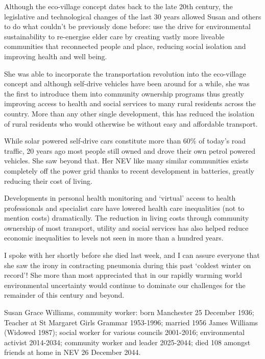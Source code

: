 Although the eco-village concept dates back to the late 20th century, the legislative and technological changes of the last 30 years allowed Susan and others to do what couldn't be previously done before: use the drive for environmental sustainability to re-energise elder care by creating vastly more liveable communities that reconnected people and place, reducing social isolation and improving health and well being. 

She was able to incorporate the transportation revolution into the eco-village concept and although self-drive vehicles have been around for a while, she was the first to introduce them into community ownership programs thus greatly improving access to health and social services to many rural residents across the country. More than any other single development, this has reduced the isolation of rural residents who would otherwise be without easy and affordable transport.

While solar powered self-drive cars constitute more than 60\% of today's road traffic, 20 years ago most people still owned and drove their own petrol powered vehicles. She saw beyond that. Her NEV like many similar communities exists completely off the power grid thanks to recent development in batteries, greatly reducing their cost of living.

Developments in personal health monitoring and ‘virtual’ access to health professionals and specialist care have lowered health care inequalities (not to mention costs) dramatically. The reduction in living costs through community ownership of most transport, utility and social services has also helped reduce economic inequalities to levels not seen in more than a hundred years.

I spoke with her shortly before she died last week, and I can assure everyone that she saw the irony in contracting pneumonia during this past `coldest winter on record'! She more than most appreciated that in our rapidly warming world environmental uncertainty would continue to dominate our challenges for the remainder of this century and beyond. 

Susan Grace Williams, community worker: born Manchester 25 December 1936; Teacher at St Margaret Girls Grammar 1953-1996; married 1956 James Williams (Widowed 1987); social worker for various councils 2001-2016; environmental activist 2014-2034; community worker and leader 2025-2044; died 108 amongst friends at home in NEV 26 December 2044.

